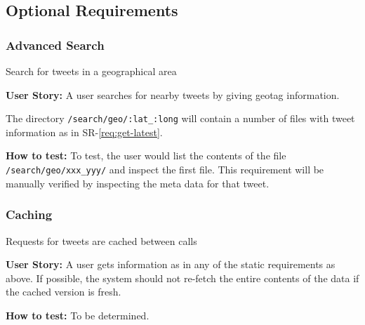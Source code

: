 \subsection{Optional Requirements}

\setcounter{requirements}{1}
\renewenvironment{Requirements}
  {\begin{list}{OR-\arabic{requirements}.}%
               {}}%
  {\end{list}}

\begin{Requirements}

\subsubsection{Advanced Search}

\item Search for tweets in a geographical area

\textbf{User Story:} A user searches for nearby tweets by giving geotag
information.

The directory \texttt{/search/geo/:lat\_:long} will contain a number of files
with tweet information as in SR-\ref{req:get-latest}.

\textbf{How to test:} To test, the user would list the contents of the file
\texttt{/search/geo/xxx\_yyy/} and inspect the first file. This requirement will
be manually verified by inspecting the meta data for that tweet.

\subsubsection{Caching}

\item Requests for tweets are cached between calls

\textbf{User Story:} A user gets information as in any of the static
requirements as above. If possible, the system should not re-fetch the entire
contents of the data if the cached version is fresh.

\textbf{How to test:} To be determined.

\end{Requirements}
